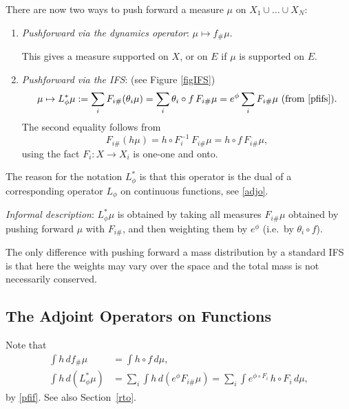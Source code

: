 \documentclass[a4paper]{amsart}
\theoremstyle{plain}
\theoremstyle{definition}
\theoremstyle{remark}
\begin{document}
There are now two ways to push forward a measure $ \mu $ on $ X_1\cup\dots\cup X_N $:
\begin{enumerate}

\item \emph{Pushforward via the dynamics operator}: $ \mu \mapsto f_{\#}\mu $.  

This gives a measure supported on $ X $, or on $ E $ if $ \mu $ is supported on $ E $.

\item \emph{Pushforward via the IFS}: (see Figure \ref{figIFS})
\begin{equation} \label{pfif} 
\mu \mapsto   L_\phi^* \mu  :=  \sum_i F_{i\#} (\theta_i   \mu ) 
 = \sum_i\theta_i \circ   f \, F_{i\#}\mu
 = e^ \phi \sum_i   F_{i\#} \mu \text{ (from \eqref{pfifs})}.
\end{equation} 
The second equality follows from
\[
F_{i\#}(h\mu) = h \circ F_i^{-1}\, F_{i\#}\mu = h\circ f \, F_{i\#}\mu,
\]
using the fact  $ F_i:X\to X_i $ is one-one and onto.

\end{enumerate} 
The reason for the notation $ L_\phi^* $ is that this operator is the dual of a corresponding operator $ L_\phi  $ on continuous functions, see \eqref{adjo}.

\medskip \emph{Informal description}:  $ L^*_\phi \mu $ is obtained by taking all measures  $ F_{i\#} \mu $ obtained by pushing forward $ \mu $ with $ F_{i\#} $, and then weighting them by $ e^\phi  $ (i.e.\ by $ \theta_i\circ f $).

 The only difference with  pushing forward a mass distribution by a standard IFS  is that here the weights may vary over the space and the total mass is not necessarily conserved.

\subsection{The Adjoint Operators on Functions}
Note that 
\begin{equation} \label{}
\begin{aligned}
\int h \, df_{\#}\mu &= \int h\circ f  \, d\mu , \\
\int h \, d(L_\phi^*\mu) &= \sum_i \int h \, d(e^\phi F_{i\#}\mu)
   =   \sum_i \int e^{\phi\circ F_i}  \, h\circ F_i    \, d\mu ,
   \end{aligned} 
   \end{equation} 
by \eqref{pfif}.   See also Section~\ref{rto}.
\end{document}
